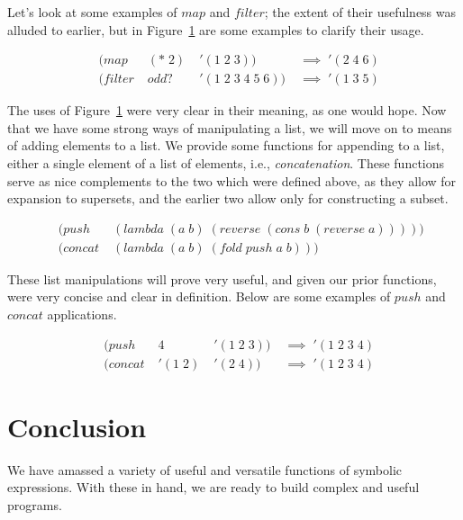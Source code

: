 Let's look at some examples of $map$ and $filter$; the extent of their
usefulness was alluded to earlier, but in Figure~\ref{fig:mapAndFilterExamples}
are some examples to clarify their usage.

\begin{figure}[htp]
\footnotesize
\caption{}\label{fig:mapAndFilterExamples}
\begin{align*}
& (map \; &(* \; 2) \; &'(1 \; 2 \; 3)) \; &\implies \; '(2 \; 4 \; 6)
\\& (filter \; &odd? \; &'(1 \; 2 \; 3 \; 4 \; 5 \; 6)) \; &\implies \; '(1 \; 3 \; 5)
\end{align*}
\end{figure}

The uses of Figure~\ref{fig:mapAndFilterExamples} were very clear in their
meaning, as one would hope. Now that we have some strong ways of manipulating a
list, we will move on to means of adding elements to a list. We provide some
functions for appending to a list, either a single element of a list of
elements, i.e., \emph{concatenation}. These functions serve as nice complements to
the two which were defined above, as they allow for expansion to supersets, and
the earlier two allow only for constructing a subset.

\begin{figure}[htp]
\footnotesize
\caption{}\label{fig:pushAndConcatDefs}
\begin{align*}
& (push \; &(lambda \; (a \; b) \; (reverse \; (cons \; b \; (reverse \; a)))))
\\& (concat \; &(lambda \; (a \; b) \; (fold \; push \; a \; b)))
\end{align*}
\end{figure}

These list manipulations will prove very useful, and given our prior functions, 
were very concise and clear in definition. Below are some examples of $push$ and 
$concat$ applications.

\begin{figure}[htp]
\footnotesize
\caption{}\label{fig:pushAndConcatExamples}
\begin{align*}
& (push \; &4 \; &'(1 \; 2 \; 3)) \; &\implies \; '(1 \; 2 \; 3 \; 4)
\\& (concat \; &'(1 \; 2) \; &'(2 \; 4)) \; &\implies \; '(1 \; 2 \; 3 \; 4)
\end{align*}
\end{figure}

\section{Conclusion}
We have amassed a variety of useful and versatile functions of symbolic 
expressions. With these in hand, we are ready to build complex and useful 
programs.
